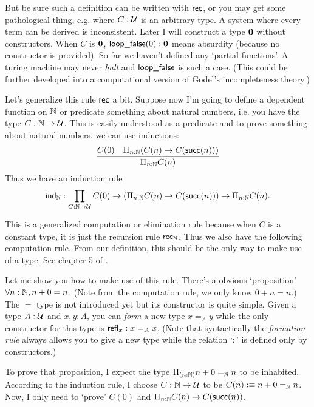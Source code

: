 But be sure such a definition can be written with $\text{\sf rec}$, or you may
get some pathological thing, e.g.
where $C:\mathcal{U}$ is an arbitrary type. A system where every term
can be derived is inconsistent. Later I will construct a type $\mathbf{0}$ 
without constructors. When $C$ is $\mathbf{0}$, $\text{\sf loop\_false}(0):\mathbf{0}$ 
means absurdity (because no constructor is provided). So far we haven't
defined any `partial functions'. A turing machine may never {\it halt}
and $\text{\sf loop\_false}$ is such a case. (This could be further developed
into a computational version of Godel's incompleteness theory.)

Let's generalize this rule $\text{\sf rec}$ a bit. Suppose now I'm going to define
a dependent function on $\mathbb{N}$ or predicate something about natural numbers,
i.e. you have the type $C: \mathbb{N}\to\mathcal{U}$. This is easily understood as
a predicate and to prove something about natural numbers, we can use inductions:
$$
    \infer{\Pi_{n:\nat}C(n)}{C(0) & \Pi_{n:\nat}(C(n)\to C(\succn(n)))}
$$
\newcommand{\ind}{\name{ind}}
Thus we have an induction rule 
$$
\ind_\nat: \prod_{C:\nat\to\universe}C(0)
    \to(\Pi_{n:\nat}C(n)\to C(\succn(n)))
    \to\Pi_{n:\nat} C(n).
$$

This is a generalized computation or elimination rule because when
$C$ is a constant type, it is just the recursion rule $\text{\sf rec}_{\mathbb{N}}$. 
Thus we also have the following computation rule.
\eq{
    \ind_\nat(C,c_0,c_s,0) &\defn c_0 \\
    \ind_\nat(C,c_0,c_s,\succn(n)) &\defn c_s(n,\ind_\nat(C,c_0,c_s,n))
}
From our definition, this should be the only way to make use of a type.
See chapter 5 of \cite{homotopy-type-theory}. 

\newcommand{\refl}{\name{refl}}
Let me show you how to make use of this rule. There's a obvious `proposition'
$\forall n:\mathbb{N}, n + 0 = n$. (Note from the computation rule, we only know
$0+n=n$.) The $=$ type is not introduced yet but its constructor is quite 
simple. Given a type $A:\mathcal{U}$ and $x,y:A$, you can {\it form} a new 
type $x=_Ay$ while the only constructor for this type is $\refl_x: x=_Ax$. 
(Note that syntactically the {\it formation rule} always allows you to 
give a new type while the relation `$:$' is defined only by constructors.)

To prove that proposition, I expect the type $\Pi_{(n:\mathbb{N})}n+0 =_{\mathbb{N}} n$
to be inhabited. According to the induction rule, I choose $C: \mathbb{N}\to\mathcal{U}$
to be $C(n):\equiv n+0=_{\mathbb{N}} n$. 
Now, I only need to `prove' $C(0)$ and $\Pi_{n:\mathbb{N}}C(n)\to C(\text{\sf succ}(n))$.

